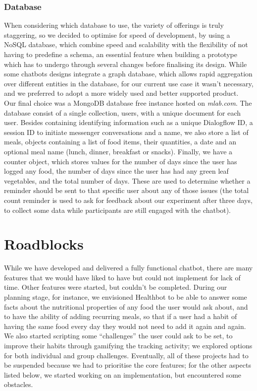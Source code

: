 \subsubsection{Database}
When considering which database to use, the variety of offerings is truly staggering, so we decided to optimise for speed of development, by using a NoSQL database, which combine speed and scalability with the flexibility of not having to predefine a schema, an essential feature when building a prototype which has to undergo through several changes before finalising its design. While some chatbots designs integrate a graph database, which allows rapid aggregation over different entities in the database, for our current use case it wasn't necessary, and we preferred to adopt a more widely used and better supported product.\\
Our final choice was a MongoDB database free instance hosted on \textit{mlab.com}. The database consist of a single collection, users, with a unique document for each user. Besides containing identifying information such as a unique Dialogflow ID, a session ID to initiate messenger conversations and a name, we also store a list of meals, objects containing a list of food items, their quantities, a date and an optional meal name (lunch, dinner, breakfast or snacks). Finally, we have a counter object, which stores values for the number of days since the user has logged any food, the number of days since the user has had any green leaf vegetables, and the total number of days. These are used to determine whether a reminder should be sent to that specific user about any of those issues (the total count reminder is used to ask for feedback about our experiment after three days, to collect some data while participants are still engaged with the chatbot).
\section{Roadblocks}
While we have developed and delivered a fully functional chatbot, there are many features that we would have liked to have but could not implement for lack of time. Other features were started, but couldn't be completed. During our planning stage, for instance, we envisioned Healthbot to be able to answer some facts about the nutritional properties of any food the user would ask about, and to have the ability of adding recurring meals, so that if a user had a habit of having the same food every day they would not need to add it again and again. We also started scripting some ``challenges'' the user could ask to be set, to improve their habits through gamifying the tracking activity; we explored options for both individual and group challenges. Eventually, all of these projects had to be suspended because we had to prioritise the core features; for the other aspects listed below, we started working on an implementation, but encountered some obstacles. 

